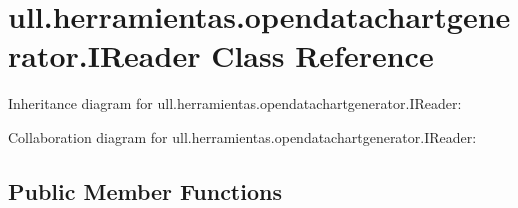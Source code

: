 \hypertarget{classull_1_1herramientas_1_1opendatachartgenerator_1_1_i_reader}{}\section{ull.\+herramientas.\+opendatachartgenerator.\+I\+Reader Class Reference}
\label{classull_1_1herramientas_1_1opendatachartgenerator_1_1_i_reader}


Inheritance diagram for ull.\+herramientas.\+opendatachartgenerator.\+I\+Reader\+:


Collaboration diagram for ull.\+herramientas.\+opendatachartgenerator.\+I\+Reader\+:
\subsection*{Public Member Functions}
